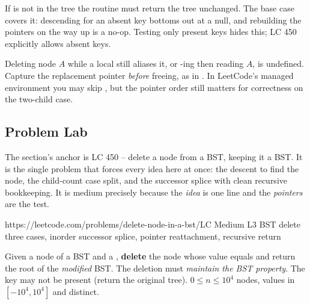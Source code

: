 \begin{warningbox}
If  is not in the tree the routine must return the tree unchanged. The base case
 covers it: descending for an absent key bottoms out at a null, and
rebuilding the pointers on the way up is a no-op. Testing only present keys hides this; LC 450
explicitly allows absent keys.
\end{warningbox}

\begin{warningbox}
Deleting node $A$ while a local  still aliases it, or -ing then reading $A$,
is undefined. Capture the replacement pointer \emph{before} freeing, as in . In
LeetCode's managed environment you may skip , but the pointer order still matters for
correctness on the two-child case.
\end{warningbox}

\subsection{Problem Lab}

The section's anchor is LC 450 -- delete a node from a BST, keeping it a BST. It is the single
problem that forces every idea here at once: the descent to find the node, the child-count case split,
and the successor splice with clean recursive bookkeeping. It is medium precisely because the \emph{idea}
is one line and the \emph{pointers} are the test.

  {https://leetcode.com/problems/delete-node-in-a-bst/}{LC Medium L3}
  {BST delete three cases, inorder successor splice, pointer reattachment, recursive return}

\begin{problemstatement}
Given a  node of a BST and a , \textbf{delete} the node whose value equals
 and return the root of the \emph{modified} BST. The deletion must \emph{maintain the BST
property}. The key may not be present (return the original tree). $0\le n\le 10^{4}$ nodes, values in
$[-10^{4},10^{4}]$ and distinct.
\end{problemstatement}

